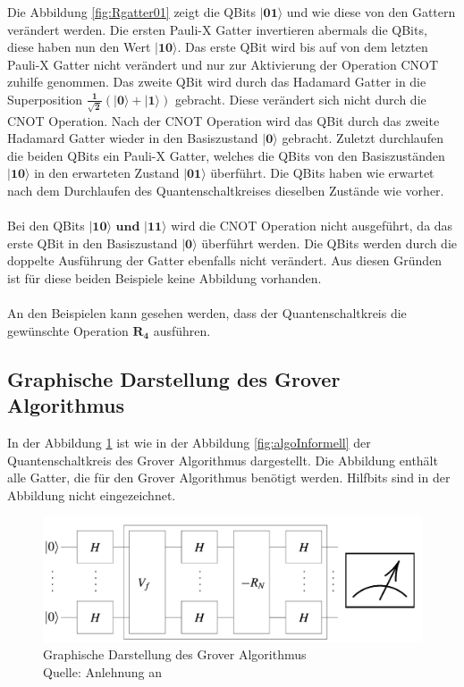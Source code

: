 \noindent
Die Abbildung \ref{fig:Rgatter01} zeigt die QBits $\mathbf{|01\rangle}$  und wie diese von den Gattern verändert werden. Die ersten Pauli-X Gatter invertieren abermals die QBits, diese haben nun den Wert $\mathbf{|10\rangle}$. Das erste QBit wird bis auf von dem letzten Pauli-X Gatter nicht verändert und nur zur Aktivierung der Operation CNOT zuhilfe genommen. Das zweite QBit wird durch das Hadamard Gatter in die Superposition $\mathbf{\frac{1}{\sqrt 2}(|0\rangle + |1\rangle)}$ gebracht. Diese verändert sich nicht durch die CNOT Operation. Nach der CNOT Operation wird das QBit durch das zweite Hadamard Gatter wieder in den Basiszustand $\mathbf{|0\rangle}$ gebracht. Zuletzt durchlaufen die beiden QBits ein Pauli-X Gatter, welches die QBits von den Basiszuständen $\mathbf{|10\rangle}$ in den erwarteten Zustand $\mathbf{|01\rangle}$ überführt. Die QBits haben wie erwartet nach dem Durchlaufen des Quantenschaltkreises dieselben Zustände wie vorher.
\\ 
\\
Bei den QBits $\mathbf{|10\rangle \text{ und }|11\rangle}$ wird die CNOT Operation nicht ausgeführt, da das erste QBit in den Basiszustand $\mathbf{|0\rangle}$ überführt werden. Die QBits werden durch die doppelte Ausführung der Gatter ebenfalls nicht verändert. Aus diesen Gründen ist für diese beiden Beispiele keine Abbildung vorhanden.
\\
\\
An den Beispielen kann gesehen werden, dass der Quantenschaltkreis die gewünschte Operation $\mathbf{R_4}$ ausführen.

\subsection{Graphische Darstellung des Grover Algorithmus}
In der Abbildung \ref{fig:algoFormell} ist wie in der Abbildung \ref{fig:algoInformell} der Quantenschaltkreis des Grover Algorithmus dargestellt. Die Abbildung enthält alle Gatter, die für den Grover Algorithmus benötigt werden. Hilfbits sind in der Abbildung nicht eingezeichnet.

\begin{figure}[hbtp]
	\centering
	\includegraphics[width=1\textwidth]{figures/algoFormell.png}
	\caption{Graphische Darstellung des Grover Algorithmus \\ Quelle: Anlehnung an \cite[S. 146]{Ho17} }
	\label{fig:algoFormell}
\end{figure}

